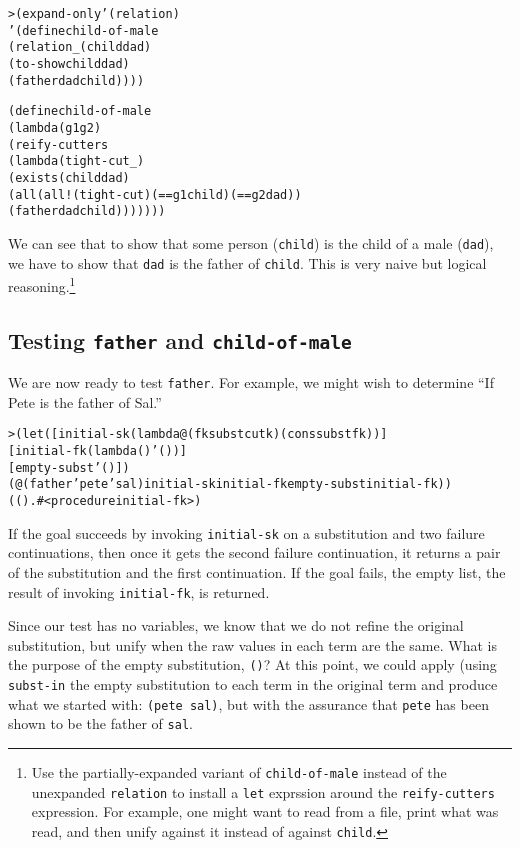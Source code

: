 \begin{alltt}
> (expand-only '(relation)
    '(define child-of-male
       (relation _ (child dad)
         (to-show child dad)
         (father dad child))))

(define child-of-male
  (lambda (g1 g2)
    (reify-cutters
      (lambda (tight-cut _)
        (exists (child dad)
          (all (all! (tight-cut) (== g1 child) (== g2 dad))
            (father dad child)))))))
\end{alltt}


We can see that to show that some person (\texttt{child}) is the child
of a male (\texttt{dad}), we have to show that \texttt{dad} is the
father of \texttt{child}.  This is very naive but logical
reasoning.\footnote{Use the partially-expanded variant of
\texttt{child-of-male} instead of the unexpanded \texttt{relation} to
install a \texttt{let} exprssion around the \texttt{reify-cutters}
expression.  For example, one might want to read from a file, print
what was read, and then unify against it instead of against
\texttt{child}.}

\subsection{Testing \texttt{father} and \texttt{child-of-male}}

We are now ready to test \texttt{father}.  For example, we might wish
to determine ``If Pete is the father of Sal.''

\begin{alltt}
> (let ([initial-sk (lambda@ (fk subst cutk) (cons subst fk))]
        [initial-fk (lambda () '())]
        [empty-subst '()])
    (@ (father 'pete 'sal) initial-sk initial-fk empty-subst initial-fk))
(() . #<procedure initial-fk>)
\end{alltt}

If the goal succeeds by invoking \texttt{initial-sk} on a substitution
and two failure continuations, then once it gets the second failure
continuation, it returns a pair of the substitution and the
first continuation. If the goal fails, the empty list, the result of
invoking \texttt{initial-fk}, is returned.

Since our test has no variables, we know that we do not refine the
original substitution, but unify when the raw values in each term are
the same.  What is the purpose of the empty substitution, \texttt{()}?
At this point, we could apply (using \texttt{subst-in} the empty
substitution to each term in the original term and produce what we
started with: \texttt{(pete sal)}, but with the assurance that
\texttt{pete} has been shown to be the father of \texttt{sal}.

